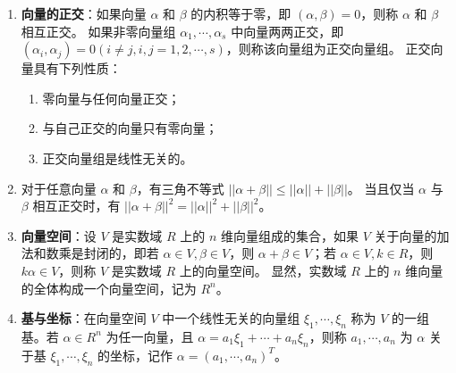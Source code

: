 \documentclass[UTF8]{ctexart}
\theoremstyle{mydef}
\begin{document}
\begin{enumerate}
    \item \textbf{向量的正交}：如果向量 $\alpha$ 和 $\beta$ 的内积等于零，即 $(\alpha, \beta)=0$，则称 $\alpha$ 和 $\beta$ 相互正交。
    如果非零向量组 $\alpha_1, \cdots, \alpha_s$ 中向量两两正交，即 $(\alpha_i, \alpha_j)=0 (i \neq j, i,j=1,2,\cdots,s)$，则称该向量组为正交向量组。
    正交向量具有下列性质：
    \begin{enumerate}
        \item 零向量与任何向量正交；
        \item 与自己正交的向量只有零向量；
        \item 正交向量组是线性无关的。
    \end{enumerate}

    \item 对于任意向量 $\alpha$ 和 $\beta$，有三角不等式 $||\alpha + \beta|| \le ||\alpha|| + ||\beta||$。
    当且仅当 $\alpha$ 与 $\beta$ 相互正交时，有 $||\alpha + \beta||^2 = ||\alpha||^2 + ||\beta||^2$。

    \item \textbf{向量空间}：设 $V$ 是实数域 $R$ 上的 $n$ 维向量组成的集合，如果 $V$ 关于向量的加法和数乘是封闭的，即若 $\alpha \in V, \beta \in V$，则 $\alpha + \beta \in V$；若 $\alpha \in V, k \in R$，则 $k\alpha \in V$，则称 $V$ 是实数域 $R$ 上的向量空间。
    显然，实数域 $R$ 上的 $n$ 维向量的全体构成一个向量空间，记为 $R^n$。

    \item \textbf{基与坐标}：在向量空间 $V$ 中一个线性无关的向量组 $\xi_1, \cdots, \xi_n$ 称为 $V$ 的一组基。若 $\alpha \in R^n$ 为任一向量，且 $\alpha = a_1\xi_1 + \cdots + a_n\xi_n$，则称 $a_1, \cdots, a_n$ 为 $\alpha$ 关于基 $\xi_1, \cdots, \xi_n$ 的坐标，记作 $\alpha = (a_1, \cdots, a_n)^T$。


\end{enumerate}
\end{document}
